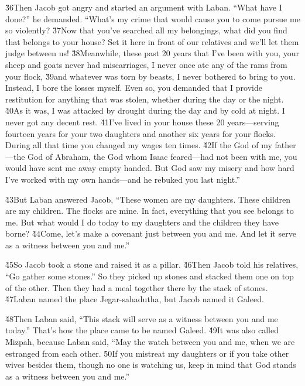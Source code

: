 \v{36}Then Jacob got angry and started an argument with Laban. ``What have I done?'' he demanded. ``What's my crime that would cause you to come pursue me so violently? \v{37}Now that you've searched all my belongings, what did you find that belongs to your house? Set it here in front of our relatives and we'll let them judge between us! \v{38}Meanwhile, these past 20 years that I've been with you, your sheep and goats never had miscarriages, I never once ate any of the rams from your flock, \v{39}and whatever was torn by beasts, I never bothered to bring to you. Instead, I bore the losses myself. Even so, you demanded that I provide restitution for anything that was stolen, whether during the day or the night. \v{40}As it was, I was attacked by drought during the day and by cold at night. I never got any decent rest. \v{41}I've lived in your house these 20 years---serving fourteen years for your two daughters and another six years for your flocks. During all that time you changed my wages ten times. \v{42}If the God of my father---the God of Abraham, the God whom Isaac feared---had not been with me, you would have sent me away empty handed. But God saw my misery and how hard I've worked with my own hands---and he rebuked you last night.''

\v{43}But Laban answered Jacob, ``These women are my daughters. These children are my children. The flocks are mine. In fact, everything that you see belongs to me. But what would I do today to my daughters and the children they have borne? \v{44}Come, let's make a covenant just between you and me. And let it serve as a witness between you and me.''

\v{45}So Jacob took a stone and raised it as a pillar. \v{46}Then Jacob told his relatives, ``Go gather some stones.'' So they picked up stones and stacked them one on top of the other. Then they had a meal together there by the stack of stones. \v{47}Laban named the place Jegar-sahadutha, but Jacob named it Galeed.

\v{48}Then Laban said, ``This stack will serve as a witness between you and me today.'' That's how the place came to be named Galeed. \v{49}It was also called Mizpah, because Laban said, ``May the  watch between you and me, when we are estranged from each other. \v{50}If you mistreat my daughters or if you take other wives besides them, though no one is watching us, keep in mind that God stands as a witness between you and me.''

